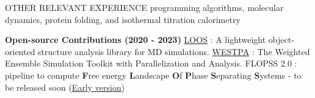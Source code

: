 \documentclass{resume} %
\begin{document}
\begin{rSection}{OTHER RELEVANT EXPERIENCE}
{      programming algorithms, molecular dynamics, protein folding, and isothermal titration calorimetry
   }
   \item \textbf{Open-source Contributions (2020 - 2023)} {\href{https://github.com/GrossfieldLab/loos}{LOOS} : A lightweight object-oriented structure analysis library for MD simulations.
      \href{https://github.com/westpa/westpa}{WESTPA} : The Weighted Ensemble Simulation Toolkit with Parallelization and Analysis}. FLOPSS 2.0 : pipeline to compute \textbf{F}ree energy \textbf{L}andscape \textbf{O}f \textbf{P}hase \textbf{S}eparating \textbf{S}ystems - to be released soon (\href{https://github.com/Poruthoor/Phase_Separation_Article/tree/main/FLOPSS}{Early version})
\end{rSection}

\end{document}
